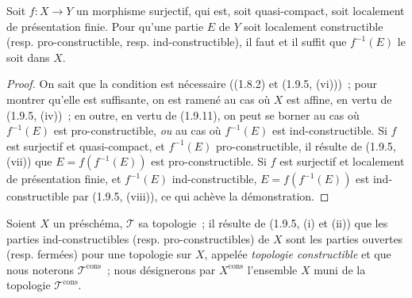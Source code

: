 \begin{corollary}[1.9.12]
\label{IV.1.9.12-fr}
Soit $f:X\to Y$ un morphisme surjectif, qui est, soit quasi-compact, soit
localement de présentation finie. Pour qu'une partie $E$ de $Y$ soit
localement constructible \textup{(resp.} pro-constructible, \textup{resp.} ind-constructible\textup{)},
il faut et il suffit que $f^{-1}(E)$ le soit dans $X$.
\end{corollary}


\begin{proof}
On sait que la condition est nécessaire ((1.8.2) et (1.9.5, (vi)))~; pour
montrer qu'elle est suffisante, on est ramené au cas où $X$ est affine, en
vertu de (1.9.5, (iv))~; en outre, en vertu de (1.9.11), on peut se borner au
cas où $f^{-1}(E)$ est pro-constructible, \emph{ou} au cas où $f^{-1}(E)$ est
ind-constructible. Si $f$ est surjectif et quasi-compact, et $f^{-1}(E)$
pro-constructible, il résulte de (1.9.5, (vii)) que
$E=f(f^{-1}(E))$ est pro-constructible. Si $f$ est surjectif et localement de
présentation finie, et $f^{-1}(E)$ ind-constructible,
$E=f(f^{-1}(E))$ est ind-constructible par (1.9.5, (viii)), ce qui achève la
démonstration.
\end{proof}

\begin{env}[1.9.13]
\label{IV.1.9.13-fr}
Soient $X$ un préschéma, $\mathscr T$ sa topologie~; il résulte de (1.9.5,
(i) et (ii)) que les parties ind-constructibles (resp. pro-constructibles) de
$X$ sont les parties ouvertes (resp. fermées) pour une topologie sur $X$,
appelée \emph{topologie constructible} et que nous noterons
$\mathscr T^{\mathrm{cons}}$~; nous désignerons par $X^{\mathrm{cons}}$
l'ensemble $X$ muni de la topologie $\mathscr T^{\mathrm{cons}}$.
\end{env}

